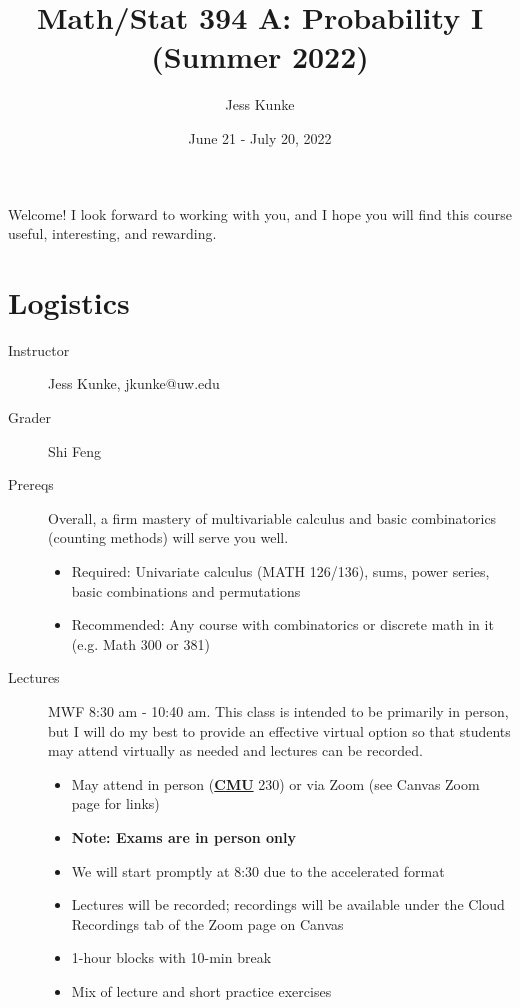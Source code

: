 \documentclass{article}
\title{Math/Stat 394 A: Probability I (Summer 2022)}
\author{Jess Kunke}
\date{June 21 - July 20, 2022}
\begin{document}
\maketitle

\large Welcome!  I look forward to working with you, and I hope you will find this course useful, interesting, and rewarding.

\normalsize

\tableofcontents

\section{Logistics}

\begin{description}
    \item[{Instructor}] Jess Kunke, jkunke@uw.edu
    \item[{Grader}] Shi Feng
    \item[{Prereqs}] Overall, a firm mastery of multivariable calculus and basic combinatorics (counting methods) will serve you well.
    \begin{itemize}
        \item Required: Univariate calculus (MATH 126/136), sums, power series, basic combinations and permutations
        \item Recommended: Any course with combinatorics or discrete math in it (e.g. Math 300 or 381)
    \end{itemize}
    \item[{Lectures}] MWF 8:30 am - 10:40 am. This class is intended to be primarily in person, but I will do my best to provide an effective virtual option so that students may attend virtually as needed and lectures can be recorded.
    \begin{itemize}
        \item May attend in person (\href{https://www.washington.edu/maps/#!/CMU}{\textbf{CMU}} 230) or via Zoom (see Canvas Zoom page for links)
        \item \textbf{Note: Exams are in person only}
        \item We will start promptly at 8:30 due to the accelerated format
        \item Lectures will be recorded; recordings will be available under the Cloud Recordings tab of the Zoom page on Canvas
        \item 1-hour blocks with 10-min break
        \item Mix of lecture and short practice exercises

\end{itemize}
\end{description}
\end{document}
